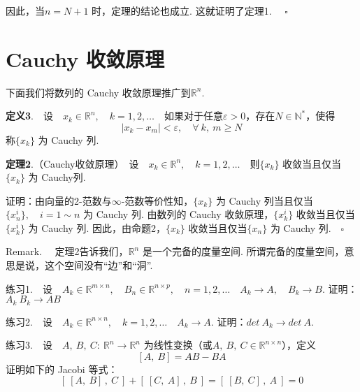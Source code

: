 \documentclass{article}
\begin{document}
\vspace{10pt}

\noindent 因此，当\(n = N + 1\) 时，定理的结论也成立. 这就证明了定理1. \(\quad \square\)

\newpage

\section{Cauchy 收敛原理}
\noindent 下面我们将数列的 Cauchy 收敛原理推广到\(\mathbb{R}^n\).

\vspace{20pt}

\noindent \textbf{定义3}.\ \ 设\ \ \(x_k \in \mathbb{R}^n,\quad k = 1,2,\dots \)\ \ 如果对于任意\(\varepsilon > 0\)，存在\(N \in \mathbb{N}^{*}\)，使得
\begin{equation*}
    | x_k - x_m |< \varepsilon ,\quad \forall\ k,\ m \ge N
\end{equation*}
称\(\{x_k\} \) 为 Cauchy 列.

\vspace{20pt}

\noindent \textbf{定理2}.（Cauchy收敛原理）\ 设\ \ \(x_k \in \mathbb{R}^n,\quad k = 1,2,\dots \)\ \ 则\(\{x_k\} \) 收敛当且仅当\(\{x_k\} \) 为 Cauchy列.

\vspace{20pt}

\noindent 证明：由向量的2-范数与\(\infty \)-范数等价性知，\(\{x_k\} \) 为 Cauchy 列当且仅当\(\{x_n^i\},\quad i = 1 \sim n \) 为 Cauchy 列. 由数列的 Cauchy 收敛原理，\(\{x_k^i\} \) 收敛当且仅当\(\{x_k^i\} \) 为 Cauchy 列. 因此，由命题2，\(\{x_k\} \) 收敛当且仅当\(\{x_n\}\) 为 Cauchy 列.\(\quad \square \)

\vspace{20pt}

\noindent Remark. \ \ 定理2告诉我们，\(\mathbb{R}^n\) 是一个完备的度量空间. 所谓完备的度量空间，意思是说，这个空间没有“边”和“洞”.

\newpage

\noindent 练习1.\ \ 设\ \ \(A_k \in \mathbb{R}^{m \times n},\quad B_n \in \mathbb{R}^{n \times p},\quad n = 1, 2,\dots \quad A_k \to A,\quad B_k \to B\). 证明：\(A_k\ B_k \to AB\)

\vspace{20pt}

\noindent 练习2.\ \ 设\ \ \(A_k \in \mathbb{R}^{n \times n},\quad k = 1,2,\dots \quad  A_k \to A\). 证明：\(det\ A_k \to det\ A\).

\vspace{30pt}

\noindent 练习3.\ \ 设\ \ \(A,\ B,\ C:\ \mathbb{R}^n \to \mathbb{R}^n\) 为线性变换（或\(A,\ B,\ C \in \mathbb{R}^{n \times n}\)），定义
\begin{equation*}
    \left[ A,\ B \right] = AB - BA
\end{equation*}
证明如下的 Jacobi 等式：
\begin{equation*}
    \left[\ [A,\ B]\,,\ C\ \right] + \left[\ [C,\ A]\,,\ B\ \right] = \left[\ [B,\ C]\,,\ A\ \right] = 0
\end{equation*}
\end{document}

